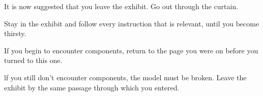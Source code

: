 \vfill
It is now suggested that you leave the exhibit. Go out through the 
curtain. 

\vfill
\clearpage
{}

\vfill
Stay in the exhibit and follow every instruction that is relevant, until
you become thirsty. 


If you begin to encounter components, return to the page you were on 
before you turned to this one. 


lf you still don't encounter components, the model must be broken. 
Leave the exhibit by the same passage through which you entered. 

\vfill 
\clearpage

